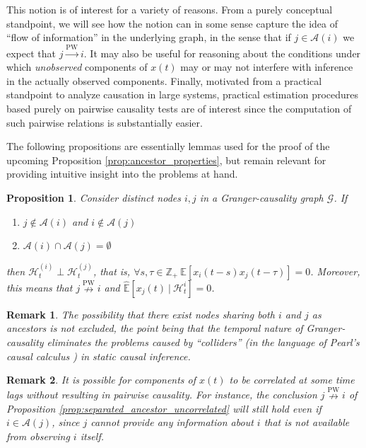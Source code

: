 \documentclass{statsoc}
\def\pwgc{\overset{\text{PW}}{\rightarrow}}  %
\def\npwgc{\overset{\text{PW}}{\nrightarrow}}  %
\def\gcg{\mathcal{G}}  %
\def\H{\mathcal{H}}  %
\newcommand{\linE}[2]{\hat{\E}[#1\ |\ #2]}  %
\newcommand{\anc}[1]{\mathcal{A}(#1)}  %
\newtheorem{proposition}{Proposition}
\newtheorem{remark}{Remark}
\def\H{\mathcal{H}}  %
\def\E{\mathbb{E}}  %
\def\Z{\mathbb{Z}}  %
\begin{document}
This notion is of interest for a variety of reasons.  From a purely
conceptual standpoint, we will see how the notion can in some sense
capture the idea of ``flow of information'' in the underlying graph,
in the sense that if $j \in \anc{i}$ we expect that $j \pwgc i$.  It may
also be useful for reasoning about the conditions under which
\textit{unobserved} components of $x(t)$ may or may not interfere with
inference in the actually observed components.  Finally, motivated
from a practical standpoint to analyze causation in large systems,
practical estimation procedures based purely on pairwise causality
tests are of interest since the computation of such pairwise relations
is substantially easier.

The following propositions are essentially lemmas used for the proof
of the upcoming Proposition \ref{prop:ancestor_properties}, but
remain relevant for providing intuitive insight into the problems at
hand.

\begin{proposition}
  Consider distinct nodes $i, j$ in a Granger-causality graph
  $\gcg$.  If

  \begin{enumerate}[label=(\alph*)]
    \item{$j \not\in \anc{i}$ and $i \not\in \anc{j}$}
    \item{$\anc{i}\cap\anc{j} = \emptyset$}
  \end{enumerate}

  then $\H_t^{(i)} \perp \H_t^{(j)}$, that is,
  $\forall s, \tau \in \Z_+\ \E[x_i(t - s)x_j(t - \tau)] = 0$.  Moreover,
  this means that $j \npwgc i$ and $\linE{x_j(t)}{\H_t^i} = 0$.
\end{proposition}

\begin{remark}
  The possibility that there exist nodes sharing both $i$ and $j$ as
  ancestors is not excluded, the point being that the temporal nature
  of Granger-causality eliminates the problems caused by ``colliders''
  (in the language of Pearl's causal calculus
  \cite{pearl2009causality}) in static causal inference.
\end{remark}

\begin{remark}
  It is possible for components of $x(t)$ to be correlated at some
  time lags without resulting in pairwise causality.  For instance,
  the conclusion $j \npwgc i$ of Proposition
  \ref{prop:separated_ancestor_uncorrelated} will still hold even if
  $i \in \anc{j}$, since $j$ cannot provide any information about $i$
  that is not available from observing $i$ itself.
\end{remark}
\end{document}
